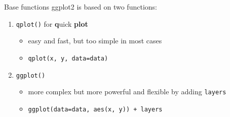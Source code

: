 \documentclass{beamer}\usepackage[]{graphicx}\usepackage[]{color}
\begin{document}
\begin{frame}{Base functions}
ggplot2 is based on two functions:
  \begin{enumerate}
		\item  \texttt{qplot()} for \textbf{q}uick \textbf{plot}
		\begin{itemize}
			\item easy and fast, but too simple in most cases
			\item \texttt{qplot(x, y, data=data)}
		\end{itemize}
    \vspace{0.5cm}
    \item \texttt{ggplot()}
      	\begin{itemize}
			\item more complex but more powerful and flexible by adding \texttt{layers}
			\item \texttt{ggplot(data=data, aes(x, y)) + layers}
		\end{itemize}
  \end{enumerate}
\end{frame}
\end{document}
